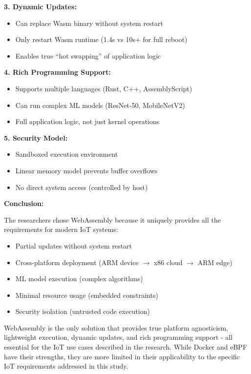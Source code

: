 \documentclass[11pt]{article}
\begin{document}
\textbf{3. Dynamic Updates:}
\begin{itemize}
\item Can replace Wasm binary without system restart
\item Only restart Wasm runtime (1.4s vs 10s+ for full reboot)
\item Enables true ``hot swapping'' of application logic
\end{itemize}

\textbf{4. Rich Programming Support:}
\begin{itemize}
\item Supports multiple languages (Rust, C++, AssemblyScript)
\item Can run complex ML models (ResNet-50, MobileNetV2)
\item Full application logic, not just kernel operations
\end{itemize}

\textbf{5. Security Model:}
\begin{itemize}
\item Sandboxed execution environment
\item Linear memory model prevents buffer overflows
\item No direct system access (controlled by host)
\end{itemize}

\textbf{Conclusion:}

The researchers chose WebAssembly because it uniquely provides all the requirements for modern IoT systems:
\begin{itemize}
\item Partial updates without system restart
\item Cross-platform deployment (ARM device $\rightarrow$ x86 cloud $\rightarrow$ ARM edge)
\item ML model execution (complex algorithms)
\item Minimal resource usage (embedded constraints)
\item Security isolation (untrusted code execution)
\end{itemize}

WebAssembly is the only solution that provides true platform agnosticism, lightweight execution, dynamic updates, and rich programming support - all essential for the IoT use cases described in the research. While Docker and eBPF have their strengths, they are more limited in their applicability to the specific IoT requirements addressed in this study.
\end{document}

